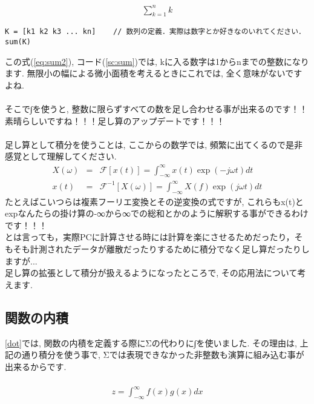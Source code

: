 \documentclass[11pt,a4paper]{ujreport}
\begin{document}
\begin{eqnarray}
\label{eq:sum2}
\sum_{k=1}^{n} k
\end{eqnarray}

\begin{lstlisting}[caption=\ref{eq:sum2}のコード,label=sc:sum,  keepspaces=true]
K = [k1 k2 k3 ... kn]    // 数列の定義．実際は数字とか好きなのいれてください．
sum(K)
\end{lstlisting}


この式(\ref{eq:sum2}), コード(\ref{sc:sum})では, kに入る数字は1からnまでの整数になります. 無限小の幅による微小面積を考えるときにこれでは, 全く意味がないですよね.\\
\\
そこで∫を使うと, 整数に限らずすべての数を足し合わせる事が出来るのです！！\\
素晴らしいですね！！！足し算のアップデートです！！！\\
\\
足し算として積分を使うことは, ここからの数学では, 頻繁に出てくるので是非感覚として理解してください.
\begin{eqnarray}
\label{eq:int3}
X(\omega) &=& \mathcal{F}[x(t)] = \int^{\infty}_{-\infty}x(t)\exp(-j \omega t)dt \\
 x(t) &=& \mathcal{F}^{-1}[X(\omega)] = \int^{\infty}_{-\infty}X(f)\exp(j \omega t)dt 
\end{eqnarray}
たとえばこいつらは複素フーリエ変換とその逆変換の式ですが, これらもx(t)とexpなんたらの掛け算の-∞から∞での総和とかのように解釈する事ができるわけです！！！\\
とは言っても，実際PCに計算させる時には計算を楽にさせるためだったり，そもそも計測されたデータが離散だったりするために積分でなく足し算だったりしますが...\\

足し算の拡張として積分が扱えるようになったところで, その応用法について考えます. 
\subsection{関数の内積 \label{dot_func}}
\ref{dot}では, 関数の内積を定義する際にΣの代わりに∫を使いました. その理由は, 上記の通り積分を使う事で, Σでは表現できなかった非整数も演算に組み込む事が出来るからです.\\
\\

\begin{eqnarray}
\label{eq:dot_func}
z = \int^{\infty}_{-\infty} f(x)g(x)dx
\end{eqnarray}
\end{document}
